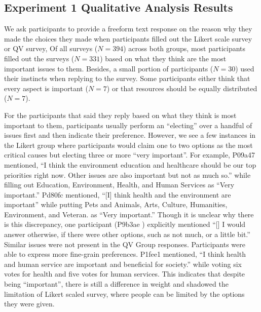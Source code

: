    
    
\subsection{Experiment 1 Qualitative Analysis Results}\label{results-1-qual}
We ask participants to provide a freeform text response on the reason why they made the choices they made
when participants filled out the Likert scale survey or QV survey,
Of all surveys ($N=394$) across both groups, most participants filled out the surveys ($N=331$) based on what they think are the most important issues to them. %
Besides, a small portion of participants ($N=30$) used their instincts when replying to the survey.
Some participants either think that every aspect is important ($N=7$) or that resources should be equally distributed ($N=7$).

For the participants that said they reply based on what they think is most important to them, 
participants usually perform an ``electing'' over a handful of issues first and then indicate their preference.
However, we see a few instances in the Likert group where participants would claim one to two options as the most critical causes but electing three or more ``very important''.
For example, P09a47 mentioned, ``I think the environment education and healthcare should be our top priorities right now. Other issues are also important but not as much so.''
while filling out Education, Environment, Health, and Human Services as ``Very important.'' 
Pd80fc mentioned, ``[I] think health and the environment are important'' while putting Pets and Animals, Arts, Culture, Humanities, Environment, and Veteran. as ``Very important.'' 
Though it is unclear why there is this discrepancy, one participant (P9b3ae
) explicitly mentioned ``[\textellipsis] I would answer otherwise, if there were other options, such as not much, or a little bit.''
Similar issues were not present in the QV Group responses.
Participants were able to express more fine-grain preferences.
P1fee1 mentioned, ``I think health and human service are important and beneficial for society.'' while voting six votes for health and five votes for human services. This indicates that despite being ``important'', there is still a difference in weight and shadowed the limitation of Likert scaled survey, where people can be limited by the options they were given.\par

